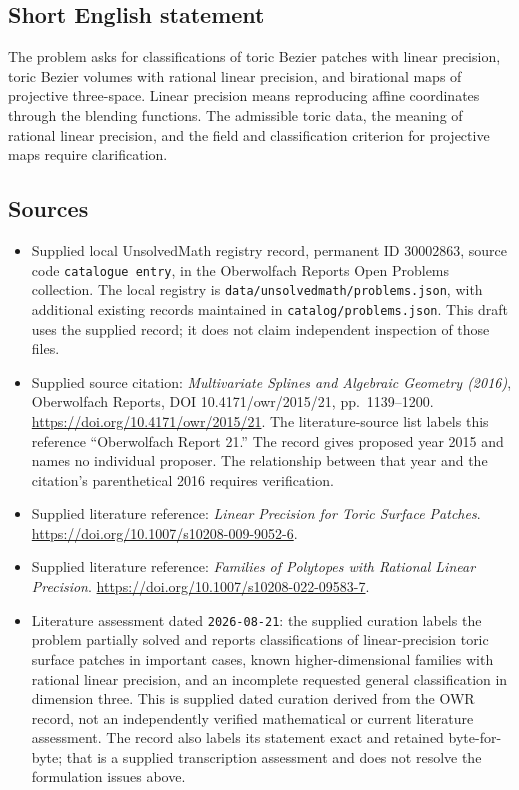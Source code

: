 \documentclass[11pt]{article}
\begin{document}
\subsection{Short English statement}
The problem asks for classifications of toric Bezier patches with linear precision, toric Bezier volumes with rational linear precision, and birational maps of projective three-space. Linear precision means reproducing affine coordinates through the blending functions. The admissible toric data, the meaning of rational linear precision, and the field and classification criterion for projective maps require clarification.
\subsection{Sources}
\begin{itemize}
\item Supplied local UnsolvedMath registry record, permanent ID \(30002863\), source code \texttt{catalogue entry}, in the Oberwolfach Reports Open Problems collection. The local registry is \texttt{data/unsolvedmath/problems.json}, with additional existing records maintained in \texttt{catalog/problems.json}. This draft uses the supplied record; it does not claim independent inspection of those files.
\item Supplied source citation: \emph{Multivariate Splines and Algebraic Geometry (2016)}, Oberwolfach Reports, DOI 10.4171/owr/2015/21, pp.\ 1139--1200. \url{https://doi.org/10.4171/owr/2015/21}. The literature-source list labels this reference ``Oberwolfach Report 21.'' The record gives proposed year 2015 and names no individual proposer. The relationship between that year and the citation's parenthetical 2016 requires verification.
\item Supplied literature reference: \emph{Linear Precision for Toric Surface Patches}. \url{https://doi.org/10.1007/s10208-009-9052-6}.
\item Supplied literature reference: \emph{Families of Polytopes with Rational Linear Precision}. \url{https://doi.org/10.1007/s10208-022-09583-7}.
\item Literature assessment dated \texttt{2026-08-21}: the supplied curation labels the problem partially solved and reports classifications of linear-precision toric surface patches in important cases, known higher-dimensional families with rational linear precision, and an incomplete requested general classification in dimension three. This is supplied dated curation derived from the OWR record, not an independently verified mathematical or current literature assessment. The record also labels its statement exact and retained byte-for-byte; that is a supplied transcription assessment and does not resolve the formulation issues above.
\end{itemize}
\end{document}
